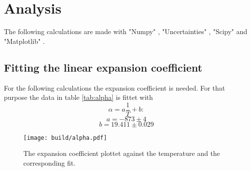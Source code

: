 \section{Analysis}
\label{sec:Auswertung}
The following calculations are made with  "Numpy" \cite{numpy}, 
"Uncertainties" \cite{uncertainties}, 
"Scipy" \cite{scipy} and  "Matplotlib" \cite{matplotlib}.

\subsection{Fitting the linear expansion coefficient}
For the following calculations the expansion coefficient is needed.
For that purpose the data in table \ref{tab:alpha}
is fittet with
\begin{equation}
    \alpha = a \frac{1}{T} + b:
    \label{eq:alpha}
\end{equation}
\begin{equation*}
    a = -873 \pm 4
\end{equation*}
\begin{equation*}
    b= 19.411 \pm 0.029
\end{equation*}

\begin{figure}
    \centering 
    \texttt{[image: build/alpha.pdf]}
    \caption{The expansion coefficient plottet against the temperature and the corresponding fit.}
\end{figure}

